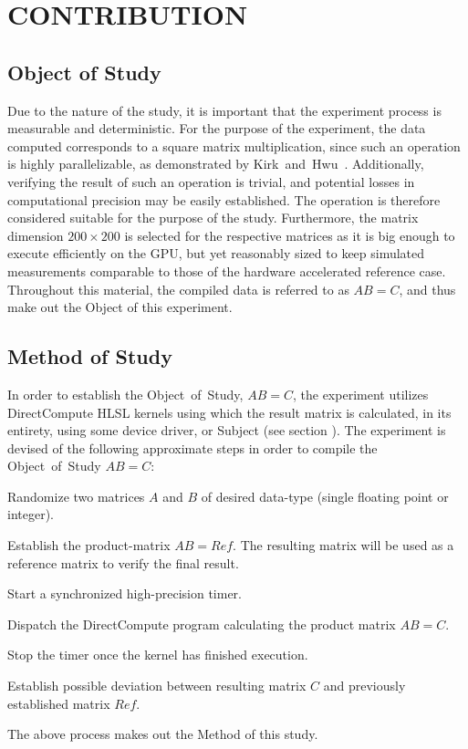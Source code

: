 
\section{CONTRIBUTION}
\label{sec:contribution}

\subsection{Object of Study}
\label{sec:contribution:objectofstudy}
Due to the nature of the study, it is important that the experiment process is measurable and deterministic.
For the purpose of the experiment, the data computed corresponds to a square matrix multiplication, since such an operation is highly parallelizable, as demonstrated by Kirk~and~Hwu~\cite[ch.~3]{Kirk:2010:PMP:1841511}.
Additionally, verifying the result of such an operation is trivial, and potential losses in computational precision may be easily established.
The operation is therefore considered suitable for the purpose of the study.
Furthermore, the matrix dimension $200\times 200$ is selected for the respective matrices as it is big enough to execute efficiently on the GPU, but yet reasonably sized to keep simulated measurements comparable to those of the hardware accelerated reference case.
Throughout this material, the compiled data is referred to as $AB=C$, and thus make out the Object of this experiment.

\subsection{Method of Study}
\label{sec:contribution:methodofstudy}
In order to establish the Object~of~Study, $AB=C$, the experiment utilizes DirectCompute HLSL kernels using which the result matrix is calculated, in its entirety, using some device driver, or Subject (see section ).
The experiment is devised of the following approximate steps in order to compile the Object~of~Study $AB=C$:
\begin{enumerate*}
	\item Randomize two matrices $A$ and $B$ of desired data-type (single floating point or integer).
	\item Establish the product-matrix $AB=Ref$. The resulting matrix will be used as a reference matrix to verify the final result.
	\item Start a synchronized high-precision timer.
	\item Dispatch the DirectCompute program calculating the product matrix $AB=C$.
	\item Stop the timer once the kernel has finished execution.
	\item Establish possible deviation between resulting matrix $C$ and previously established matrix $Ref$.
\end{enumerate*}
The above process  makes out the Method of this study.

